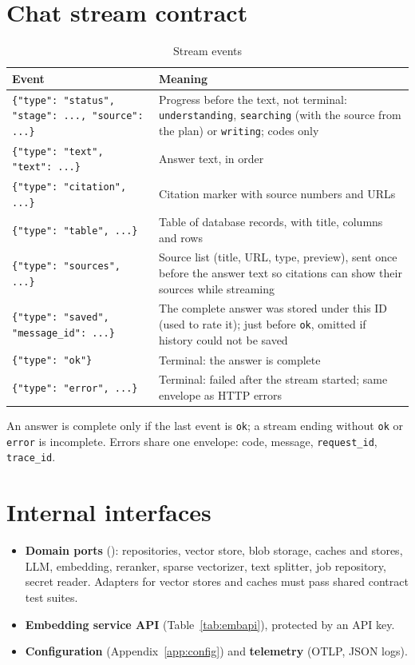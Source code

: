 \documentclass[11pt,letterpaper]{report}
\begin{document}
\section{Chat stream contract}
\begin{table}[H]
\centering
\caption{Stream events}\label{tab:events}
\begin{tabularx}{\textwidth}{@{}P{5.6cm}L@{}}
\toprule
\textbf{Event} & \textbf{Meaning} \\
\midrule
\texttt{\{"type": "status", "stage": ..., "source": ...\}} & Progress before the text, not terminal: \texttt{understanding}, \texttt{searching} (with the source from the plan) or \texttt{writing}; codes only \\
\texttt{\{"type": "text", "text": ...\}} & Answer text, in order \\
\texttt{\{"type": "citation", ...\}} & Citation marker with source numbers and URLs \\
\texttt{\{"type": "table", ...\}} & Table of database records, with title, columns and rows \\
\texttt{\{"type": "sources", ...\}} & Source list (title, URL, type, preview), sent once before the answer text so citations can show their sources while streaming \\
\texttt{\{"type": "saved", "message\_id": ...\}} & The complete answer was stored under this ID (used to rate it); just before \texttt{ok}, omitted if history could not be saved \\
\texttt{\{"type": "ok"\}} & Terminal: the answer is complete \\
\texttt{\{"type": "error", ...\}} & Terminal: failed after the stream started; same envelope as HTTP errors \\
\bottomrule
\end{tabularx}
\end{table}
An answer is complete only if the last event is \texttt{ok}; a stream ending without \texttt{ok} or
\texttt{error} is incomplete. Errors share one envelope: code, message, \texttt{request\_id},
\texttt{trace\_id}.

\section{Internal interfaces}
\begin{itemize}
  \item \textbf{Domain ports} (): repositories, vector store, blob storage,
        caches and stores, LLM, embedding, reranker, sparse vectorizer, text splitter, job repository,
        secret reader. Adapters for vector stores and caches must pass shared contract test suites.
  \item \textbf{Embedding service API} (Table~\ref{tab:embapi}), protected by an API key.
  \item \textbf{Configuration} (Appendix~\ref{app:config}) and \textbf{telemetry} (OTLP, JSON logs).
\end{itemize}
\end{document}
